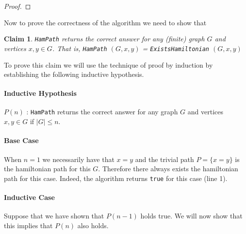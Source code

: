 \documentclass[answers]{exam}
\newtheorem{claim}{Claim}
\begin{document}
\begin{questions}
\begin{parts}
\begin{solution}
\begin{proof}
\end{proof}

Now to prove the correctness of the algorithm we need to show that\\

\begin{claim}
\texttt{HamPath} returns the correct answer for any (finite) graph $G$ and vertices $x,y \in G$. That is, \texttt{HamPath} $(G, x, y)$ = \texttt{ExistsHamiltonian} $(G, x, y)$
\end{claim}

To prove this claim we will use the technique of proof by induction by establishing the following inductive hypothesis.
\paragraph{Inductive Hypothesis} $P(n)$ : \texttt{HamPath} returns the correct answer for any graph $G$ and vertices $x,y \in G$ if $|G| \leq n$.

\paragraph{Base Case} When $n = 1$ we necessarily have that $x = y$ and the trivial path $P = \{ x=y \}$ is the hamiltonian path for this $G$. Therefore there always exists the hamiltonian path for this case. Indeed, the algorithm returns \texttt{true} for this case (line 1).

\paragraph{Inductive Case} Suppose that we have shown that $P(n-1)$ holds true. We will now show that this implies that $P(n)$ also holds.


\end{solution}
\end{parts}
\end{questions}
\end{document}
